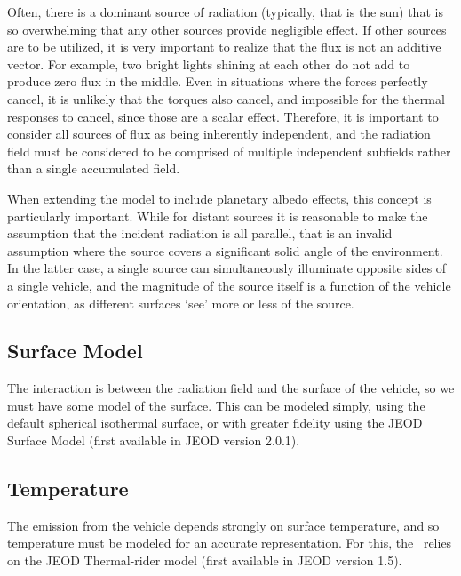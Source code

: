 Often, there is a dominant source of radiation (typically, that is the sun) that is so overwhelming that any other sources provide negligible effect.  If other sources are to be utilized, it is very important to realize that the flux is not an additive vector.  For example, two bright lights shining at each other do not add to produce zero flux in the middle.  Even in situations where the forces perfectly cancel, it is unlikely that the torques also cancel, and impossible for the thermal responses to cancel, since those are a scalar effect.  Therefore, it is important to consider all sources of flux as being inherently independent, and the radiation field must be considered to be comprised of multiple independent subfields rather than a single accumulated field.

When extending the model to include planetary albedo effects, this concept is particularly important.  While for distant sources it is reasonable to make the assumption that the incident radiation is all parallel, that is an invalid assumption where the source covers a significant solid angle of the environment.  In the latter case, a single source can simultaneously illuminate opposite sides of a single vehicle, and the magnitude of the source itself is a function of the vehicle orientation, as different surfaces `see' more or less of the source.

\subsection {Surface Model}
The interaction is between the radiation field and the surface of the vehicle, so we must have some model of the surface.  This can be modeled simply, using the default spherical isothermal surface, or with greater fidelity using the JEOD Surface Model (first available in JEOD version 2.0.1).

\subsection {Temperature}
The emission from the vehicle depends strongly on surface temperature, and so temperature must be modeled for an accurate representation.  For this, the \RadiationPressureDesc\ relies on the JEOD Thermal-rider model (first available in JEOD version 1.5).
